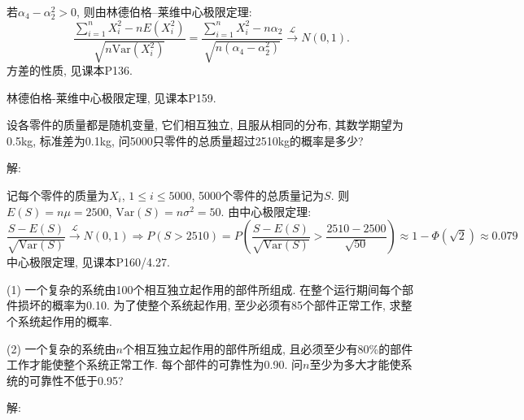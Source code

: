 \documentclass[standard]{ExBook}
\renewenvironment{shaded}{%
  \def\FrameCommand{\fboxsep=\FrameSep \colorbox{shadecolor}}%
  \MakeFramed{\advance\hsize-\width \FrameRestore}%
}{%
  \endMakeFramed
}
\begin{document}
\begin{qitems}
若$\alpha_4-\alpha_2^2>0$, 则由林德伯格--莱维中心极限定理:
$$
\frac{\sum\limits_{i=1}^{n}X_i^2-nE(X_i^2)}
{\sqrt{n\mathrm{Var}(X_i^2)}}
=
\frac{\sum\limits_{i=1}^{n}X_i^2-n\alpha_2}
{\sqrt{n(\alpha_4-\alpha_2^2)}}
\xrightarrow{\mathcal{L}}N(0,1).
$$
\textcolor{themeColor}{\selectfont {}
方差的性质, 见课本P136.}

\textcolor{themeColor}{\selectfont {}
林德伯格-莱维中心极限定理, 见课本P159.}

\vspace{2.5cm-5em}

    \begin{bbox}
    \begin{shaded}
        \qitem
设各零件的质量都是随机变量, 它们相互独立, 且服从相同的分布, 其数学期望为0.5kg, 标准差为0.1kg, 问5000只零件的总质量超过2510kg的概率是多少?
    \end{shaded}
    \end{bbox}

\vspace{\dimexpr2.5cm-5em\relax}

解: 

记每个零件的质量为$X_i$, $1\leq i\leq 5000$, 5000个零件的总质量记为$S$. 则$E(S)=n\mu=2500$, $\mathrm{Var}(S)=n\sigma^2=50$. 由中心极限定理:
$$\displaystyle\frac{S-E(S)}{\sqrt{\mathrm{Var}(S)}} \xrightarrow{\mathcal{L}} N(0,1) \Longrightarrow P(S>2510) = P\left(\frac{S-E(S)}{\sqrt{\mathrm{Var}(S)}}>\frac{2510-2500}{\sqrt{50}}\right) \approx 1-\Phi\left(\sqrt{2}\right)\approx0.079$$
\textcolor{themeColor}{\selectfont {} 中心极限定理, 见课本P160/4.27.}

\vspace{2.5cm-5em}

    \begin{bbox}
    \begin{shaded}
        \qitem

(1) 一个复杂的系统由100个相互独立起作用的部件所组成. 在整个运行期间每个部件损坏的概率为0.10. 为了使整个系统起作用, 至少必须有85个部件正常工作, 求整个系统起作用的概率.

(2) 一个复杂的系统由$ n $个相互独立起作用的部件所组成, 且必须至少有80\%的部件工作才能使整个系统正常工作. 每个部件的可靠性为0.90. 问$ n $至少为多大才能使系统的可靠性不低于0.95?
    \end{shaded}
    \end{bbox}

\vspace{\dimexpr2.5cm-5em\relax}

解: 


\end{qitems}
\end{document}
